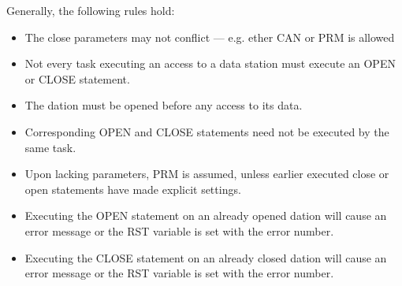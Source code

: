 Generally, the following rules hold:
\begin{itemize}
\item The close parameters may not conflict --- e.g. ether CAN or PRM is allowed
\item Not every task executing an access to a data station must execute
an OPEN or CLOSE statement.
\item The dation must be opened before any access to its data.

\item Corresponding OPEN and CLOSE statements need not be executed by
the same task.
\item Upon lacking parameters, PRM is assumed, unless earlier
executed close or open statements have made explicit settings.

\item
Executing the OPEN statement on an already opened dation
will cause an error message or the RST variable is set with the error
number.
\item
Executing the CLOSE statement on an already closed dation
will cause an error message or the RST variable is set with the error
number.
\end{itemize}

